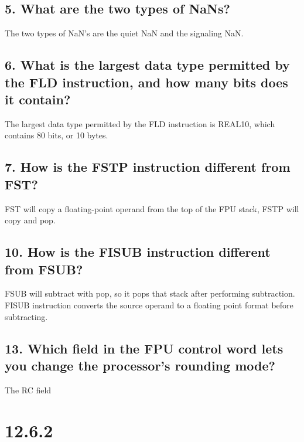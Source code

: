 \documentclass[12pt]{article}
\begin{document}
\subsection*{5. What are the two types of NaNs?}
%

The two types of NaN's are the quiet NaN and the signaling NaN.
\subsection*{6. What is the largest data type permitted by the FLD instruction, and how many bits does it contain?}
%

The largest data type permitted by the FLD instruction is REAL10, which contains 80 bits, or 10 bytes. 
\subsection*{7. How is the FSTP instruction different from FST?}
%

 FST will copy a floating-point operand from the top of the FPU stack, FSTP will copy and pop.
\subsection*{10. How is the FISUB instruction different from FSUB?}
%

FSUB will subtract with pop, so it pops that stack after performing subtraction. FISUB instruction converts the source operand to a floating point format before subtracting. 
\subsection*{13. Which field in the FPU control word lets you change the processor’s rounding mode?}
%
The RC field


\section*{12.6.2}
%
\end{document}
